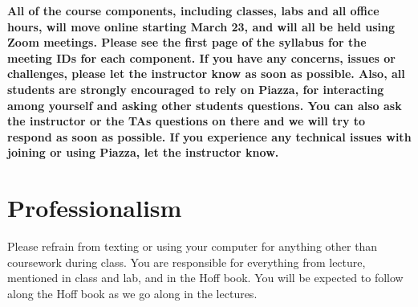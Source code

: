 \documentclass[11pt, a4paper]{article}
\begin{document}
{\color{darkred} \textbf{All of the course components, including classes, labs and all office hours, will move online starting March 23, and will all be held using Zoom meetings. Please see the first page of the syllabus for the meeting IDs for each component. If you have any concerns, issues or challenges, please let the instructor know as soon as possible. Also, all students are strongly encouraged to rely on Piazza, for interacting among yourself and asking other students questions. You can also ask the instructor or the TAs questions on there and we will try to respond as soon as possible.  If you experience any technical issues with joining or using Piazza, let the instructor know.}}


\section{Professionalism}
Please refrain from texting or using your computer for anything other than coursework during class. You are responsible for everything from lecture, mentioned in class and lab, and in the Hoff book. You will be expected to follow along the Hoff book as we go along in the lectures.
\end{document}
